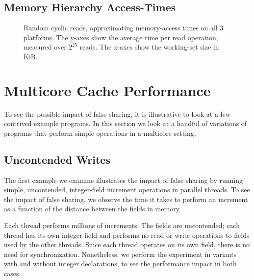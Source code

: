 \subsection{Memory Hierarchy Access-Times}

\begin{figure}[hbpt]
	\graphicspath{{plots/}}
	\begin{subfigure}{1\textwidth}
		
	\end{subfigure}
	\begin{subfigure}{1\textwidth}
		
	\end{subfigure}
	\begin{subfigure}{1\textwidth}
		
	\end{subfigure}
	\caption{Random cyclic reads, approximating memory-access times on all 3
	platforms. The y-axes show the average time per read operation, measured
	over $2^{25}$ reads. The x-axes show the working-set size in KiB.}
	\label{fig:readtimes}
\end{figure}

\section{Multicore Cache Performance}

To see the possible impact of false sharing, it is illustrative to look at a
few contrived example programs. In this section we look at a handful of
variations of programs that perform simple operations in a multicore
setting.

\subsection{Uncontended Writes}
The first example we examine illustrates the impact of false sharing by running
simple, uncontended, integer-field increment operations in parallel threads. To see
the impact of false sharing, we observe the time it takes to perform an
increment as a function of the distance between the fields in memory.


Each thread performs millions of increments. The fields are
uncontended; each thread has its own integer-field and performs no read or write
operations to fields used by the other threads. Since each thread operates on
its own field, there is no need for synchronization. Nonetheless, we perform
the experiment in variants with and without  integer declarations, to
see the performance impact in both cases.

